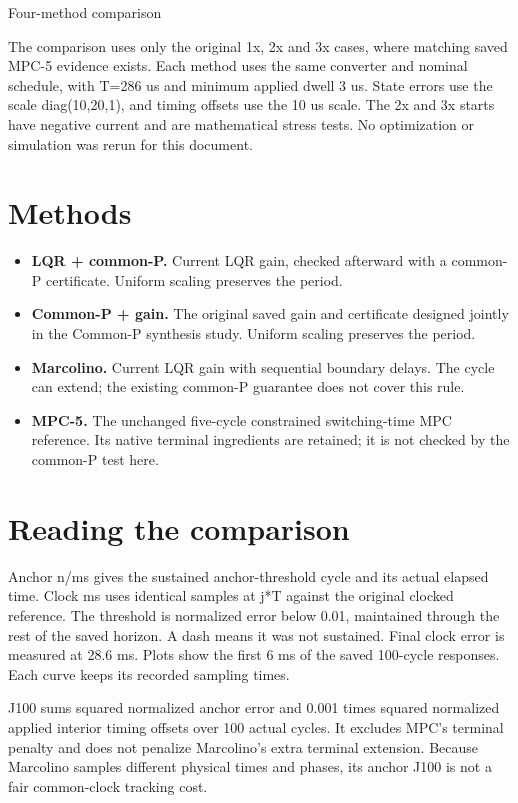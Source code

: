 \documentclass[11pt,a4paper]{article}
\begin{document}
\begin{center}{\Large Four-method comparison}\end{center}
The comparison uses only the original 1x, 2x and 3x cases, where matching saved MPC-5 evidence exists. Each method uses the same converter and nominal schedule, with T=286 us and minimum applied dwell 3 us. State errors use the scale diag(10,20,1), and timing offsets use the 10 us scale. The 2x and 3x starts have negative current and are mathematical stress tests. No optimization or simulation was rerun for this document.
\section*{Methods}
\begin{itemize}
\item \textbf{LQR + common-P.} Current LQR gain, checked afterward with a common-P certificate. Uniform scaling preserves the period.
\item \textbf{Common-P + gain.} The original saved gain and certificate designed jointly in the Common-P synthesis study. Uniform scaling preserves the period.
\item \textbf{Marcolino.} Current LQR gain with sequential boundary delays. The cycle can extend; the existing common-P guarantee does not cover this rule.
\item \textbf{MPC-5.} The unchanged five-cycle constrained switching-time MPC reference. Its native terminal ingredients are retained; it is not checked by the common-P test here.
\end{itemize}

\section*{Reading the comparison}
Anchor n/ms gives the sustained anchor-threshold cycle and its actual elapsed time. Clock ms uses identical samples at j*T against the original clocked reference. The threshold is normalized error below 0.01, maintained through the rest of the saved horizon. A dash means it was not sustained. Final clock error is measured at 28.6 ms. Plots show the first 6 ms of the saved 100-cycle responses. Each curve keeps its recorded sampling times.

J100 sums squared normalized anchor error and 0.001 times squared normalized applied interior timing offsets over 100 actual cycles. It excludes MPC's terminal penalty and does not penalize Marcolino's extra terminal extension. Because Marcolino samples different physical times and phases, its anchor J100 is not a fair common-clock tracking cost.
\end{document}
